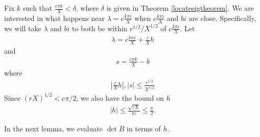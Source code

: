 \documentclass[thesis.tex]{subfiles}
\begin{document}
Fix $k$ such that $\frac{c \pi k}{X} < \delta$, where $\delta$ is given in Theorem \ref{locateeigtheorem}. We are interested in what happens near $\lambda = c \frac{k \pi i}{X}$ when $c \frac{k \pi i}{X}$ and $bi$ are close. Specifically, we will take $\lambda$ and $bi$ to both be within $r^{1/2}/X^{1/2}$ of $c \frac{k \pi i}{X}$. Let
\begin{align}\label{lambdah1}
\lambda = c \frac{k \pi i}{X} + \frac{c}{X}h
\end{align}
and
\begin{align}\label{lambdas1}
s = \frac{c \pi k}{X} - b
\end{align}
where
\begin{align}\label{hsbounds}
\left| \frac{c}{X}h \right|, |s| \leq \frac{r^{1/2}}{X^{1/2}}
\end{align}
Since $(r X)^{1/2} < c \pi/2$, we also have the bound on $h$
\begin{align}\label{hbound1}
|h| \leq \frac{\sqrt{r X}}{\pi c} \leq \frac{\pi}{2}.
\end{align}


In the next lemma, we evaluate $\det B$ in terms of $h$.
\end{document}
